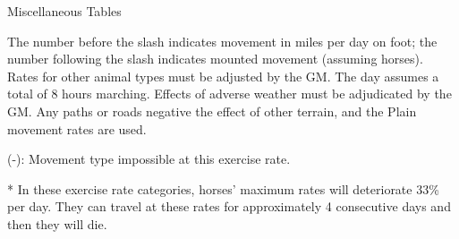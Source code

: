 \begin{Tables}{Miscellaneous Tables}
\begin{multicols}{2}
The number before the slash indicates movement in miles per day on
foot; the number following the slash indicates mounted movement
(assuming horses). Rates for other animal types must be adjusted by
the GM.  The day assumes a total of 8 hours marching. Effects of
adverse weather must be adjudicated by the GM.  Any paths or roads
negative the effect of other terrain, and the Plain movement rates are
used.

(-): Movement type impossible at this exercise rate. 

* In these exercise rate categories, horses’ maximum rates will
deteriorate 33\% per day. They can travel at these rates for
approximately 4 consecutive days and then they will die.
\end{multicols}

\end{Tables}

